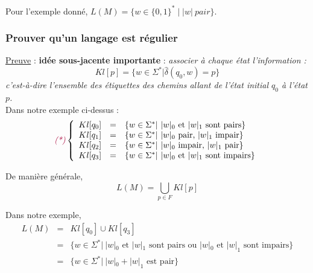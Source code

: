 \documentclass{article}
\newcommand{\titre}[1]{\textcolor{title}{#1}}
\newcommand{\tsssect}[1]{\titre{\subsubsection{#1}}}
\newcommand{\term}[1]{\textit{\textcolor{maintitle}{#1}}}
\begin{document}
\begin{sffamily}
\begin{itemize}
Pour l'exemple donné, $L(M) = \{w\in \{0,1\}^* \mid |w|\ pair\}$.
\end{itemize}
\tsssect{Prouver qu'un langage est régulier}

\noindent \underline{Preuve} : \textbf{idée sous-jacente importante} : \textit{associer à chaque état l'information : }
$$ Kl[p] = \{w \in \Sigma^* | \hat{\delta}(q_0,w)=p \} $$
\textit{c'est-à-dire l'ensemble des étiquettes des chemins allant de l'état initial $q_0$ à l'état $p$.} \\

\noindent Dans notre exemple ci-dessus : 
$$\term{(*)}\left\{\begin{array}{lll}
Kl[q_0]& = &\{ w \in \Sigma^* |\ |w|_0\text{ et }|w|_1\text{ sont pairs}\} \\
Kl[q_1]& = &\{ w \in \Sigma^* |\ |w|_0\text{ pair, }|w|_1\text{ impair}\} \\
Kl[q_2]& = &\{ w \in \Sigma^* |\ |w|_0\text{ impair, }|w|_1\text{ pair}\} \\
Kl[q_3]& = &\{ w \in \Sigma^* |\ |w|_0\text{ et }|w|_1\text{ sont impairs}\} \\
\end{array}\right.$$

\noindent De manière générale, $$ L(M) = \bigcup_{p\in F} Kl[p] $$
\newpage

Dans notre exemple, \begin{eqnarray*}
L(M) & = & Kl[q_0] \cup Kl[q_3] \\
             & = & \{ w \in \Sigma^* |\ |w|_0\text{ et }|w|_1\text{ sont pairs ou }|w|_0\text{ et }|w|_1\text{ sont 
             impairs}\} \\
             & = & \{ w \in \Sigma^* |\ |w|_0 + |w|_1\text{ est pair}\} 
\end{eqnarray*}


\end{sffamily}
\end{document}
